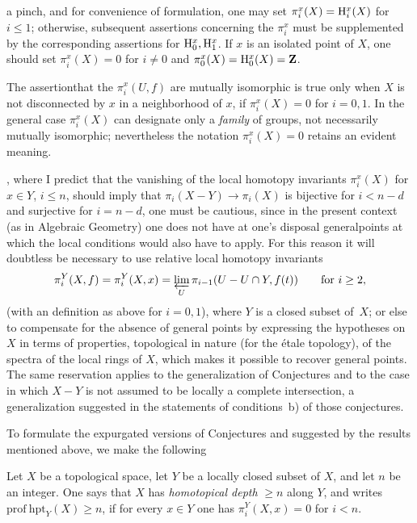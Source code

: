  a pinch, and for convenience of formulation, one may set $\pi_i^x(X)=\mathrm H_i^x(X)$ for $i\leq 1$; otherwise, subsequent assertions concerning the $\pi_i^x$ must be supplemented by the corresponding assertions for $\mathrm H_0^x,\mathrm H_1^x$. If $x$ is an isolated point of $X$, one should set $\pi_i^x(X)=0$ for $i\neq 0$ and $\pi_0^x(X)=\mathrm H_0^x(X)=\mathbf Z$.

The assertion\pageoriginale that the $\pi_i^x(U,f)$ are mutually isomorphic is true only when $X$ is not disconnected by $x$ in a neighborhood of $x$, \ie if $\pi_i^x(X)=0$ for $i=0,1$. In the general case $\pi_i^x(X)$ can designate only a \emph{family} of groups, not necessarily mutually isomorphic; nevertheless the notation $\pi_i^x(X)=0$ retains an evident meaning.

\label{p26y}, where I predict that the vanishing of the local homotopy invariants $\pi_i^x(X)$ for $x\in Y$, $i\leq n$, should imply that $\pi_i(X-Y)\to\pi_i(X)$ is bijective for $i<n-d$ and surjective for $i=n-d$, one must be cautious, since in the present context (as in Algebraic Geometry) one does not have at one's disposal \og general\fg points at which the local conditions would also have to apply. For this reason it will doubtless be necessary to use relative local homotopy invariants
$$
\pi_i^Y(X,f)=\pi_i^Y(X,x)=\varprojlim_U\pi_{i-1}(U-U\cap Y,f(t))\qquad\text{for }i\geq 2,
$$
(with an {} definition as above for $i=0,1$), where $Y$ is a closed subset of~$X$; or else to compensate for the absence of general points by expressing the hypotheses on $X$ in terms of properties, topological in nature (for the \'etale topology), of the spectra of the local rings of $X$, which makes it possible to recover general points. The same reservation applies to the generalization of Conjectures  and  to the case in which $X-Y$ is not assumed to be locally a complete intersection, a generalization suggested in the statements of conditions~b) of those conjectures.

To formulate the expurgated versions of Conjectures  and  suggested by the results mentioned above, we make the following

\begin{supdefinition} \label{XIII.6.1}
Let $X$ be a topological space, let $Y$ be a locally closed subset of $X$, and let $n$ be an integer. One says that $X$ has \emph{homotopical depth} $\geq n$ along $Y$, and writes $\mathrm{prof\:hpt}_Y(X)\geq n$, if for every $x\in Y$ one has $\pi_i^Y(X,x)=0$ for $i<n$.
\end{supdefinition}

